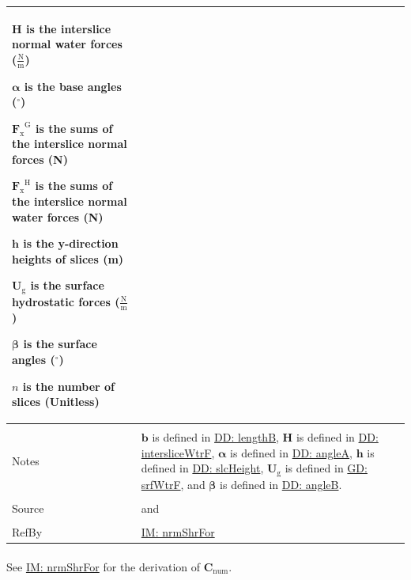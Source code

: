 \documentclass[12pt]{article}
\begin{document}
\begin{minipage}{\textwidth}
\begin{tabular}{>{\raggedright}p{}>{\raggedright\arraybackslash}p{}}
\begin{symbDescription}
              \item{$\mathbf{H}$ is the interslice normal water forces ($\frac{\text{N}}{\text{m}}$)}
              \item{$\mathbf{α}$ is the base angles (${}^{\circ}$)}
              \item{${{\mathbf{F}_{\text{x}}}^{\text{G}}}$ is the sums of the interslice normal forces (N)}
              \item{${{\mathbf{F}_{\text{x}}}^{\text{H}}}$ is the sums of the interslice normal water forces (N)}
              \item{$\mathbf{h}$ is the y-direction heights of slices (m)}
              \item{${\mathbf{U}_{\text{g}}}$ is the surface hydrostatic forces ($\frac{\text{N}}{\text{m}}$)}
              \item{$\mathbf{β}$ is the surface angles (${}^{\circ}$)}
              \item{$n$ is the number of slices (Unitless)}
              \end{symbDescription}
\\ \midrule \\
Notes & $\mathbf{b}$ is defined in \hyperref[DD:lengthB]{DD: lengthB}, $\mathbf{H}$ is defined in \hyperref[DD:intersliceWtrF]{DD: intersliceWtrF}, $\mathbf{α}$ is defined in \hyperref[DD:angleA]{DD: angleA}, $\mathbf{h}$ is defined in \hyperref[DD:slcHeight]{DD: slcHeight}, ${\mathbf{U}_{\text{g}}}$ is defined in \hyperref[GD:srfWtrF]{GD: srfWtrF}, and $\mathbf{β}$ is defined in \hyperref[DD:angleB]{DD: angleB}.
\\ \midrule \\
Source & \cite{chen2005} and \cite{karchewski2012}
\\ \midrule \\
RefBy & \hyperref[IM:nrmShrFor]{IM: nrmShrFor}
\\ \bottomrule
\end{tabular}
\end{minipage}
\paragraph{}
\label{IM:nrmShrForNumDeriv}
See \hyperref[IM:nrmShrFor]{IM: nrmShrFor} for the derivation of ${\mathbf{C}_{\text{num}}}$.
\par~
\end{document}
